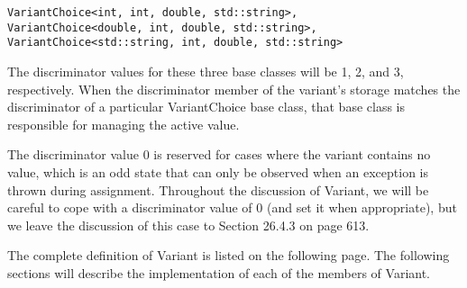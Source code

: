 \begin{lstlisting}[style=styleCXX]
VariantChoice<int, int, double, std::string>,
VariantChoice<double, int, double, std::string>,
VariantChoice<std::string, int, double, std::string>
\end{lstlisting}

The discriminator values for these three base classes will be 1, 2, and 3, respectively. When the discriminator member of the variant’s storage matches the discriminator of a particular VariantChoice base class, that base class is responsible for managing the active value.

The discriminator value 0 is reserved for cases where the variant contains no value, which is an odd state that can only be observed when an exception is thrown during assignment. Throughout the discussion of Variant, we will be careful to cope with a discriminator value of 0 (and set it when appropriate), but we leave the discussion of this case to Section 26.4.3 on page 613.

The complete definition of Variant is listed on the following page. The following sections will describe the implementation of each of the members of Variant.

